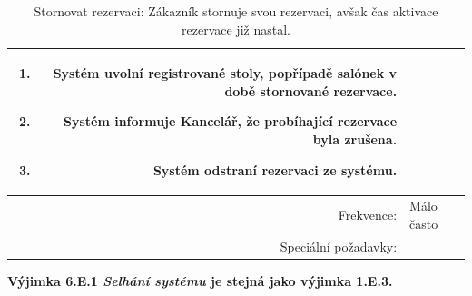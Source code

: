 \documentclass[a4paper,10pt]{article}
\begin{document}
\begin{table}[ht!]
{\begin{tabular}{| r | p{12cm} |}
\begin{minipage}[t]{0.75\textwidth}
\begin{enumerate}[nosep,after=\strut]
            \item Systém uvolní registrované stoly, popřípadě salónek v době stornované rezervace.
            \item Systém informuje Kancelář, že probíhající rezervace byla zrušena.
            \item Systém odstraní rezervaci ze systému. 
    	\end{enumerate}
    \end{minipage} \\
    \hline
    Frekvence: & Málo často \\
    \hline
    Speciální požadavky: & \\  
        \hline

\end{tabular}}
\caption{Stornovat rezervaci: Zákazník stornuje svou rezervaci, avšak čas aktivace rezervace již nastal.}
\label{table:2}
\end{table}

\textbf{Výjimka 6.E.1 \textit{Selhání systému} je stejná jako výjimka 1.E.3.}
\newpage
\end{document}
